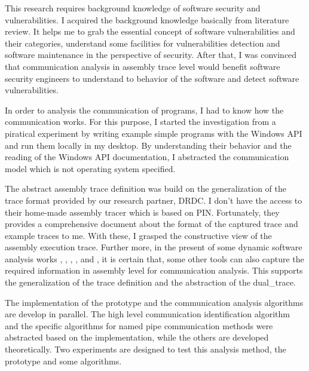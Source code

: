 This research requires background knowledge of software security and vulnerabilities. I acquired the background knowledge basically from literature review. It helps me to grab the essential concept of software vulnerabilities and their categories, understand some facilities for vulnerabilities detection and software maintenance in the perspective of security. After that, I was convinced that communication analysis in assembly trace level would benefit software security engineers to understand to behavior of the software and detect software vulnerabilities. 

In order to analysis the communication of programs, I had to know how the communication works. For this purpose, I started the investigation from a piratical experiment by writing example simple programs with the Windows API and run them locally in my desktop. By understanding their behavior and the reading of the Windows API documentation, I abstracted the communication model which is not operating system specified.

The abstract assembly trace definition was build on the generalization of the trace format provided by our research partner, DRDC. I don't have the access to their home-made assembly tracer which is based on PIN\cite{_pin_????}. Fortunately, they provides a comprehensive document about the format of the captured trace and example traces to me. With these, I grasped the constructive view of the assembly execution trace. Further more, in the present of some dynamic software analysis works \cite{godefroid2008automated}, \cite{li2013software}, \cite{sailer2016coretana}, \cite{balakrishnan2004analyzing}, \cite{bhansali2006framework} and \cite{trumper2012maintenance}, it is certain that, some other tools can also capture the required information in assembly level for communication analysis. This supports the generalization of the trace definition and the abstraction of the dual\_trace.

The implementation of the prototype and the communication analysis algorithms are develop in parallel. The high level communication identification algorithm and the specific algorithms for named pipe communication methods were abstracted based on the implementation, while the others are developed theoretically. Two experiments are designed to test this analysis method, the prototype and some algorithms. 



